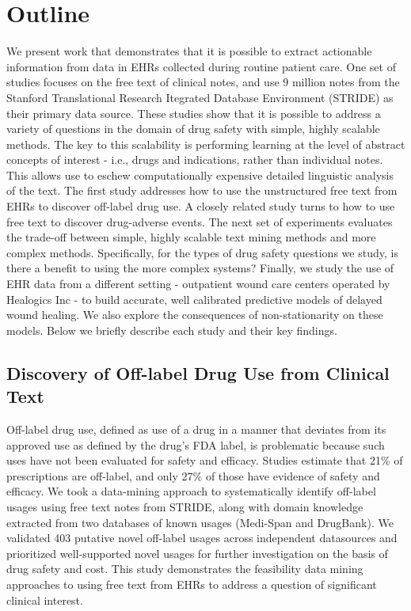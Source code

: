 \section{Outline}
We present work that demonstrates that it is possible to extract
actionable information from data in EHRs collected during routine
patient care.  One set of studies focuses on the free text of clinical
notes, and use 9 million notes from the Stanford Translational
Research Itegrated Database Environment (STRIDE) \cite{Lowe2009} as
their primary data source.  These studies show that it is possible to
address a variety of questions in the domain of drug safety with
simple, highly scalable methods.  The key to this scalability is
performing learning at the level of abstract concepts of interest -
i.e., drugs and indications, rather than individual notes.  This
allows use to eschew computationally expensive detailed linguistic
analysis of the text.  The first study addresses how to use the
unstructured free text from EHRs to discover off-label drug use.  A
closely related study turns to how to use free text to discover
drug-adverse events.  The next set of experiments evaluates the
trade-off between simple, highly scalable text mining methods and more
complex methods.  Specifically, for the types of drug safety questions
we study, is there a benefit to using the more complex systems?
Finally, we study the use of EHR data from a different setting -
outpatient wound care centers operated by Healogics Inc - to build
accurate, well calibrated predictive models of delayed wound healing.
We also explore the consequences of non-stationarity on these
models. Below we briefly describe each study and their key findings.

\subsection{Discovery of Off-label Drug Use from Clinical Text}
Off-label drug use, defined as use of a drug in a manner that deviates
from its approved use as defined by the drug's FDA label, is
problematic because such uses have not been evaluated for safety and
efficacy.  Studies estimate that 21\% of prescriptions are off-label,
and only 27\% of those have evidence of safety and efficacy.  We took
a data-mining approach to systematically identify off-label usages
using free text notes from STRIDE, along with domain knowledge
extracted from two databases of known usages (Medi-Span and DrugBank).
We validated 403 putative novel off-label usages across independent
datasources and prioritized well-supported novel usages for further
investigation on the basis of drug safety and cost.  This study
demonstrates the feasibility data mining approaches to using free text
from EHRs to address a question of significant clinical interest.

